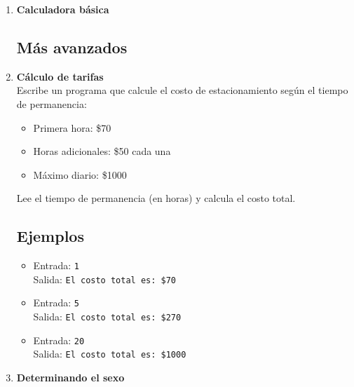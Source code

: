 \begin{enumerate}
    \item \textbf{Calculadora básica}\\
    

\subsection*{Más avanzados}
    \item \textbf{Cálculo de tarifas}\\
    Escribe un programa que calcule el costo de estacionamiento según el tiempo de permanencia:
    \begin{itemize}
        \item Primera hora: \$70
        \item Horas adicionales: \$50 cada una
        \item Máximo diario: \$1000
    \end{itemize}
    Lee el tiempo de permanencia (en horas) y calcula el costo total.
    \subsection*{Ejemplos}
    \begin{itemize}
        \item Entrada: \texttt{1}\\
              Salida: \texttt{El costo total es: \$70}
        \item Entrada: \texttt{5}\\
              Salida: \texttt{El costo total es: \$270}
        \item Entrada: \texttt{20}\\
              Salida: \texttt{El costo total es: \$1000}
    \end{itemize}
    
    \item \textbf{Determinando el sexo}\\
    
\end{enumerate}

\newpage
